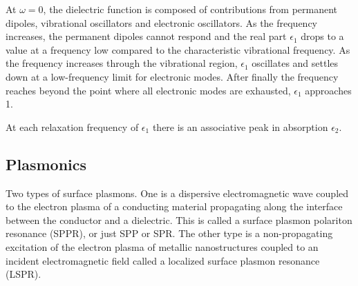 \begin{itemize}
    At $\omega=0$, the dielectric function is composed of contributions from permanent dipoles, vibrational oscillators and electronic oscillators. As the frequency increases, the permanent dipoles cannot respond and the real part $\epsilon_1$ drops to a value at a frequency low compared to the characteristic vibrational frequency. As the frequency increases through the vibrational region, $\epsilon_1$ oscillates and settles down at a low-frequency limit for electronic modes. After finally the frequency reaches beyond the point where all electronic modes are exhausted, $\epsilon_1$ approaches 1.
    
    At each relaxation frequency of $\epsilon_1$ there is an associative peak in absorption $\epsilon_2$.
\end{itemize}

\subsection{Plasmonics}
Two types of surface plasmons. One is a dispersive electromagnetic wave coupled to the electron plasma of a conducting material propagating along the interface between the conductor and a dielectric. This is called a surface plasmon polariton resonance (SPPR), or just SPP or SPR. The other type is a non-propagating excitation of the electron plasma of metallic nanostructures coupled to an incident electromagnetic field called a localized surface plasmon resonance (LSPR).

